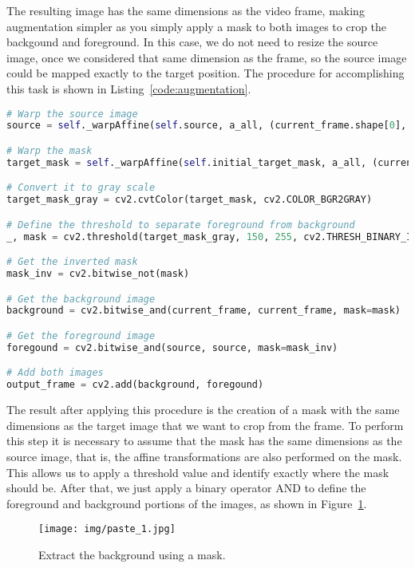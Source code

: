 \documentclass[]{IEEEtran}
\begin{document}
The resulting image has the same dimensions as the video frame, making augmentation simpler as you simply apply a mask to both images to crop the backgound and foreground. In this case, we do not need to resize the source image, once we considered that same dimension as the frame, so the source image could be mapped exactly to the target position. The procedure for accomplishing this task is shown in Listing~\ref{code:augmentation}.

\begin{lstlisting}[language=Python, caption={Augmentation algorithm}, label={code:augmentation}]
# Warp the source image
source = self._warpAffine(self.source, a_all, (current_frame.shape[0], current_frame.shape[1]))

# Warp the mask
target_mask = self._warpAffine(self.initial_target_mask, a_all, (current_frame.shape[0], current_frame.shape[1]))

# Convert it to gray scale
target_mask_gray = cv2.cvtColor(target_mask, cv2.COLOR_BGR2GRAY)

# Define the threshold to separate foreground from background
_, mask = cv2.threshold(target_mask_gray, 150, 255, cv2.THRESH_BINARY_INV)

# Get the inverted mask
mask_inv = cv2.bitwise_not(mask)

# Get the background image
background = cv2.bitwise_and(current_frame, current_frame, mask=mask)

# Get the foreground image
foregound = cv2.bitwise_and(source, source, mask=mask_inv)

# Add both images
output_frame = cv2.add(background, foregound)
\end{lstlisting}


The result after applying this procedure is the creation of a mask with the same dimensions as the target image that we want to crop from the frame. To perform this step it is necessary to assume that the mask has the same dimensions as the source image, that is, the affine transformations are also performed on the mask. This allows us to apply a threshold value and identify exactly where the mask should be. After that, we just apply a binary operator AND to define the foreground and background portions of the images, as shown in Figure~\ref{fig:paste_1}.

\begin{figure}[H]
     \centering
     \texttt{[image: img/paste\_1.jpg]}
      \caption{Extract the background using a mask.}
     \label{fig:paste_1}
\end{figure}
\end{document}
